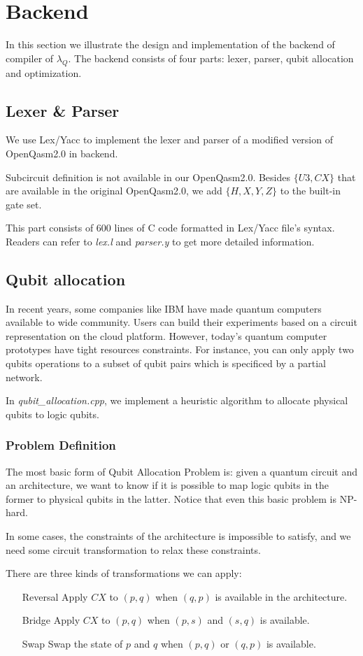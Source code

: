\section{Backend} \label{back}
In this section we illustrate the design and implementation of the backend of compiler of $\lambda_Q$.
The backend consists of four parts: lexer, parser, qubit allocation and optimization.
\subsection{Lexer \& Parser}
We use Lex/Yacc to implement the lexer and parser of a modified version of OpenQasm2.0 in backend.

Subcircuit definition is not available in our OpenQasm2.0. Besides $\{U3,CX\}$ that are available in the original OpenQasm2.0, we add $\{H,X,Y,Z\}$ to the built-in gate set.

This part consists of 600 lines of C code formatted in Lex/Yacc file's syntax.
Readers can refer to \textit{lex.l} and \textit{parser.y} to get more detailed information.

\subsection{Qubit allocation}
In recent years, some companies like IBM have made quantum computers available to wide community.
Users can build their experiments based on a circuit representation on the cloud platform. However, today's quantum computer prototypes have tight resources constraints.
For instance, you can only apply two qubits operations to a subset of qubit pairs which is specificed by a partial network.

In \textit{qubit\_allocation.cpp}, we implement a heuristic algorithm  to allocate physical qubits to logic qubits.

\subsubsection{Problem Definition}
The most basic form of Qubit Allocation Problem is: given a quantum circuit and an architecture, we want to know if it is possible to map logic qubits in the former to physical qubits in the latter.
Notice that even this basic problem is NP-hard.

In some cases, the constraints of the architecture is impossible to satisfy, and we need some circuit transformation to relax these constraints.

There are three kinds of transformations we can apply:
\begin{itemize}
    \item[Reversal] Apply $CX$ to $(p,q)$ when $(q,p)$ is available in the architecture.
    \item[Bridge] Apply $CX$ to $(p,q)$ when $(p,s)$ and $(s, q)$ is available.
    \item[Swap] Swap the state of $p$ and $q$ when $(p,q)$ or $(q,p)$ is available.
\end{itemize}

